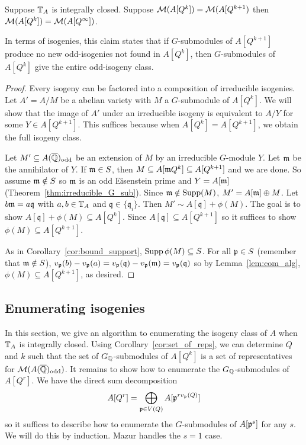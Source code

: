 \documentclass{article}
\renewcommand{\q}{\mathfrak{q}}
\newcommand{\odd}{\mathrm{odd}}
\begin{document}
\begin{corollary}
    \label{cor:set_of_reps}
    Suppose $\mathbb{T}_A$ is integrally closed. Suppose $\mathcal{M}(A[Q^k])=\mathcal{M}(A[Q^{k+1})$
    then $\mathcal{M}(A[Q^k])=\mathcal{M}(A[Q^\infty])$.

    In terms of isogenies, this claim states that if $G$-submodules of
    $A[Q^{k+1}]$ produce no new odd-isogenies not found in $A[Q^k]$, then
    $G$-submodules of $A[Q^k]$ give the entire odd-isogeny class.
\end{corollary}
\begin{proof}
    Every isogeny can be factored into a composition of irreducible isogenies.
    Let $A'=A/M$ be a abelian variety with $M$ a $G$-submodule of $A[Q^k]$. We
    will show that the image of $A'$ under an irreducible isogeny is equivalent
    to $A/Y$ for some $Y\in A[Q^{k+1}]$. This suffices because when
    $A[Q^k]=A[Q^{k+1}]$, we obtain the full isogeny class.

    Let $M'\subseteq A(\QQbar)_\odd$ be an extension of $M$ by an irreducible
    $G$-module $Y$. Let $\mathfrak{m}$ be the annihilator of $Y$. If $\mathfrak{m}\in S$, then
    $M\subseteq A[\mathfrak{m} Q^k]\subseteq A[Q^{k+1}]$ and we are done. So assume
    $\mathfrak{m}\notin S$ so $\mathfrak{m}$ is an odd Eisenstein prime and $Y=A[\mathfrak{m}]$
    (Theorem~\ref{thm:irreducible_G_sub}). Since $\mathfrak{m}\notin \operatorname{Supp}(M)$, $M' =
    A[\mathfrak{m}]\oplus M$. Let $b\m=a\q$ with $a,b\in \mathbb{T}_A$ and $\q\in \{\q_i\}$.
    Then $M'\sim A[\q] + \phi(M)$. The goal is to show $A[\q]+\phi(M)\subseteq
    A[Q^k]$. Since $A[\q]\subseteq A[Q^{k+1}]$ so it suffices to show
    $\phi(M)\subseteq A[Q^{k+1}]$.
    
    As in Corollary~\ref{cor:bound_support}, $\operatorname{Supp}\phi(M)\subseteq S$. For all
    $\mathfrak{p}\in S$ (remember that $\mathfrak{m} \notin S$), $v_\p(b)-v_\p(a) =
    v_\p(\q)-v_\p(\m)=v_\p(\q)$ so by Lemma~\ref{lem:com_alg},
    $\phi(M)\subseteq A[Q^{k+1}]$, as desired.
\end{proof}

\subsection{Enumerating isogenies}%
\label{sub:enumerating_isogenies}

In this section, we give an algorithm to enumerating the isogeny class of $A$
when $\mathbb{T}_A$ is integrally closed. Using Corollary~\ref{cor:set_of_reps}, we
can determine $Q$ and $k$ such that the set of $G_{\mathbb{Q}}$-submodules of $A[Q^k]$
is a set of representatives for $\M(A(\QQbar)_\odd)$. It remains to show how to
enumerate the $G_{\mathbb{Q}}$-submodules of $A[Q^r]$. We have the direct sum
decomposition
\[
    A[Q^r]=\bigoplus_{\mathfrak{p}\in V(Q)} A[\mathfrak{p}^{rv_{\mathfrak{p}}(Q)}]
\]
so it suffices to describe how to enumerate the $G$-submodules of $A[\mathfrak{p}^s]$ for
any $s$. We will do this by induction. Mazur handles the $s=1$ case.
\end{document}
